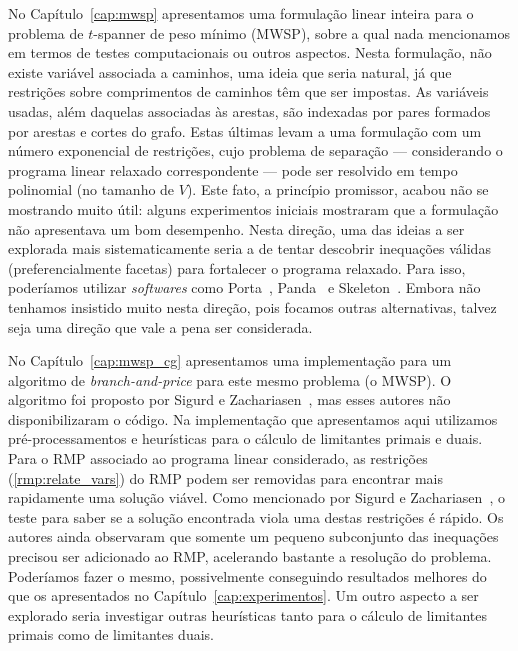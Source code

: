 No Capítulo~\ref{cap:mwsp} apresentamos uma formulação linear inteira
para o problema de $t$-spanner de peso mínimo (MWSP), sobre a qual
nada mencionamos em termos de testes computacionais ou outros
aspectos.  Nesta formulação, não existe variável associada a caminhos,
uma ideia que seria natural, já que restrições sobre comprimentos de
caminhos têm que ser impostas. As variáveis usadas, além daquelas
associadas às arestas, são indexadas por pares formados por arestas e
cortes do grafo.  Estas últimas levam a uma formulação com um número
exponencial de restrições, cujo problema de separação --- considerando
o programa linear relaxado correspondente --- pode ser resolvido em
tempo polinomial (no tamanho de $V$). Este fato, a princípio promissor, acabou não se
mostrando muito útil: alguns experimentos iniciais mostraram que a
formulação não apresentava um bom desempenho. Nesta direção, uma das
ideias a ser explorada mais sistematicamente seria a de tentar
descobrir inequações válidas (preferencialmente facetas) para
fortalecer o programa relaxado.  Para isso, poderíamos utilizar
\emph{softwares} como Porta~\cite{Porta2018},
Panda~\cite{LorwaldR2015} e Skeleton~\cite{Zolotykh2012}. Embora não
tenhamos insistido muito nesta direção, pois focamos outras
alternativas, talvez seja uma direção que vale a pena ser considerada.


No Capítulo~\ref{cap:mwsp_cg} apresentamos uma implementação para um
algoritmo de \emph{branch-and-price} para este mesmo problema (o
MWSP).  O algoritmo foi proposto por Sigurd e
Zachariasen~\cite{SigurdZ2004}, mas esses autores não disponibilizaram
o código. Na implementação que apresentamos aqui utilizamos pré-processamentos e
heurísticas para o cálculo de limitantes primais e duais.  Para o RMP
associado ao programa linear considerado, as restrições
(\ref{rmp:relate_vars}) do RMP podem ser removidas para encontrar mais
rapidamente uma solução viável. Como mencionado por Sigurd e
Zachariasen~\cite{SigurdZ2004}, o teste para saber se a solução
encontrada viola uma destas restrições é rápido. Os autores ainda
observaram que somente um pequeno subconjunto das inequações precisou
ser adicionado ao RMP, acelerando bastante a resolução do
problema. Poderíamos fazer o mesmo, possivelmente conseguindo
resultados melhores do que os apresentados no
Capítulo~\ref{cap:experimentos}. Um outro aspecto a ser explorado
seria investigar outras heurísticas tanto para o cálculo de limitantes
primais como de limitantes duais.

